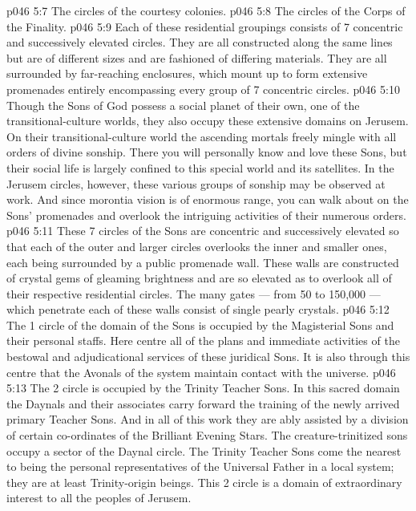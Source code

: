 \vs p046 5:7 \bibnobreakspace The circles of the courtesy colonies.
\vs p046 5:8 \bibnobreakspace The circles of the Corps of the Finality.
\vs p046 5:9 \pc Each of these residential groupings consists of 7 concentric and successively elevated circles. They are all constructed along the same lines but are of different sizes and are fashioned of differing materials. They are all surrounded by far\hyp{}reaching enclosures, which mount up to form extensive promenades entirely encompassing every group of 7 concentric circles.
\vs p046 5:10 \bibnobreakspace {} Though the Sons of God possess a social planet of their own, one of the transitional\hyp{}culture worlds, they also occupy these extensive domains on Jerusem. On their transitional\hyp{}culture world the ascending mortals freely mingle with all orders of divine sonship. There you will personally know and love these Sons, but their social life is largely confined to this special world and its satellites. In the Jerusem circles, however, these various groups of sonship may be observed at work. And since morontia vision is of enormous range, you can walk about on the Sons’ promenades and overlook the intriguing activities of their numerous orders.
\vs p046 5:11 These 7 circles of the Sons are concentric and successively elevated so that each of the outer and larger circles overlooks the inner and smaller ones, each being surrounded by a public promenade wall. These walls are constructed of crystal gems of gleaming brightness and are so elevated as to overlook all of their respective residential circles. The many gates --- from 50 to 150,000 --- which penetrate each of these walls consist of single pearly crystals.
\vs p046 5:12 The 1 circle of the domain of the Sons is occupied by the Magisterial Sons and their personal staffs. Here centre all of the plans and immediate activities of the bestowal and adjudicational services of these juridical Sons. It is also through this centre that the Avonals of the system maintain contact with the universe.
\vs p046 5:13 The 2 circle is occupied by the Trinity Teacher Sons. In this sacred domain the Daynals and their associates carry forward the training of the newly arrived primary Teacher Sons. And in all of this work they are ably assisted by a division of certain co\hyp{}ordinates of the Brilliant Evening Stars. The creature\hyp{}trinitized sons occupy a sector of the Daynal circle. The Trinity Teacher Sons come the nearest to being the personal representatives of the Universal Father in a local system; they are at least Trinity\hyp{}origin beings. This 2 circle is a domain of extraordinary interest to all the peoples of Jerusem.
